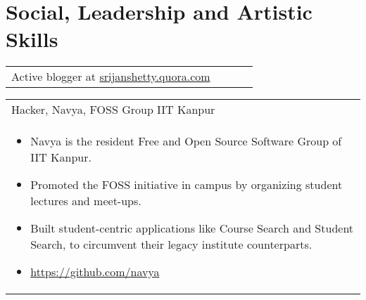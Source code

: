 \documentclass[a4paper,10pt]{article} %
\newcommand{\projectlist}[2]{
    \begin{tabular}{p{\linewidth}}
        \textcolor{NavyBlue}{#1}\\
        \vspace{-0.3cm}
        \footnotesize{#2}
    \end{tabular}
    \vspace{-0.4cm}
}
\newcommand{\skill}[2]{
    \begin{tabular}{p{0.85\linewidth}r}
        #2 & \multicolumn{1}{m{3cm}}{\raggedleft \textsc{#1}}\\
    \end{tabular}
    \vspace{-0.5cm}
}
\begin{document}

\section {Social, Leadership and Artistic Skills}

\skill {}
       {Active blogger at \href{srijanshetty.quora.com} {srijanshetty.quora.com}}

\projectlist {Hacker, Navya, FOSS Group IIT Kanpur}
             {
                   \begin{itemize}[leftmargin=0.5cm]
                       \item Navya is the resident Free and Open Source Software Group of IIT Kanpur.
                       \item Promoted the FOSS initiative in campus by organizing student lectures and meet-ups.
                       \item Built student-centric applications like Course Search and Student Search, to circumvent
                           their legacy institute counterparts.
                       \item \href{https://github.com/navya} {https://github.com/navya}
                   \end{itemize}
             }
\end{document}
